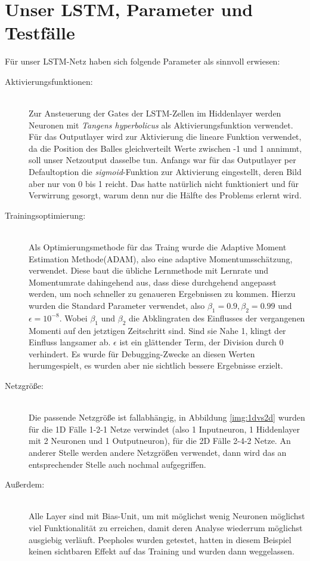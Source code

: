 \section{Unser LSTM, Parameter und Testfälle}
Für unser LSTM-Netz haben sich folgende Parameter als sinnvoll erwiesen:
\begin{description}	\item[Aktivierungsfunktionen:]\hfill \\ 
	Zur Ansteuerung der Gates der LSTM-Zellen im Hiddenlayer werden Neuronen mit \textit{Tangens hyperbolicus} als Aktivierungsfunktion verwendet. Für das Outputlayer wird zur Aktivierung die lineare Funktion verwendet, da die Position des Balles gleichverteilt Werte zwischen -1 und 1 annimmt, soll unser Netzoutput dasselbe tun. Anfangs war für das Outputlayer per Defaultoption die \textit{sigmoid}-Funktion zur Aktivierung eingestellt, deren Bild aber nur von 0 bis 1 reicht. Das hatte natürlich nicht funktioniert und für Verwirrung gesorgt, warum denn nur die Hälfte des Problems erlernt wird.  
	\item[Trainingsoptimierung:]\hfill \\ 
	Als Optimierungsmethode für das Traing wurde die Adaptive Moment Estimation Methode(ADAM), also eine adaptive Momentumsschätzung, verwendet. Diese baut die übliche Lernmethode mit Lernrate und Momentumrate dahingehend aus, dass diese durchgehend angepasst werden, um noch schneller zu genaueren Ergebnissen zu kommen. Hierzu wurden die Standard Parameter verwendet, also $ \beta_{1}=0.9, \beta_{2}=0.99 $ und $ \epsilon = 10^{-8}$. Wobei $ \beta_{1} $ und $ \beta_{2} $ die Abklingraten des Einflusses der vergangenen Momenti auf den jetztigen Zeitschritt sind. Sind sie Nahe 1, klingt der Einfluss langsamer ab. $ \epsilon$ ist ein glättender Term, der Division durch 0 verhindert. \cite{bib:adam} Es wurde für Debugging-Zwecke an diesen Werten herumgespielt, es wurden aber nie sichtlich bessere Ergebnisse erzielt.
	\item[Netzgröße:]\hfill \\ 
	Die passende Netzgröße ist  fallabhängig, in Abbildung \ref{img:1dvs2d} wurden für die 1D Fälle 1-2-1 Netze verwindet (also 1 Inputneuron, 1 Hiddenlayer mit 2 Neuronen und 1 Outputneuron), für die 2D Fälle 2-4-2 Netze. An anderer Stelle werden andere Netzgrößen verwendet, dann wird das an entsprechender Stelle auch nochmal aufgegriffen.
	\item[Außerdem:]\hfill \\
	Alle Layer sind mit Bias-Unit, um mit möglichst wenig Neuronen möglichst viel Funktionalität zu erreichen, damit deren Analyse wiederrum möglichst ausgiebig verläuft. Peepholes \cite{bib:lstm2} wurden getestet, hatten in diesem Beispiel keinen sichtbaren Effekt auf das Training und wurden dann weggelassen.  
\end{description}
